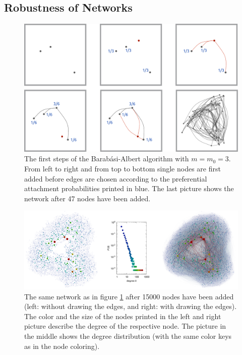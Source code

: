 \documentclass{scrartcl}
\begin{document}
\subsection{Robustness of Networks}
\begin{figure}
    \includegraphics[width=\textwidth]{pictures/21_begin.pdf}
    \caption{The first steps of the Barab\'asi-Albert algorithm with $m
    = m_0 = 3$. From left to right and from top to bottom single nodes are
    first added before edges are chosen according to the preferential
    attachment probabilities printed in blue. The last picture shows the network
    after 47 nodes have been added.}
    \label{fig:21_begin}
\end{figure}

\begin{figure}
    \includegraphics[width=\textwidth]{pictures/21_end.pdf}
    \caption{The same network as in figure \ref{fig:21_begin} after 15000
    nodes have been added (left: without drawing the edges, and right: with
    drawing the edges). The color and the size of the nodes printed in the left
    and right picture describe the degree of the respective node. The
    picture in the middle shows the degree distribution (with the same color
    keys as in the node coloring).}
    \label{fig:21_end}
\end{figure}
\end{document}
